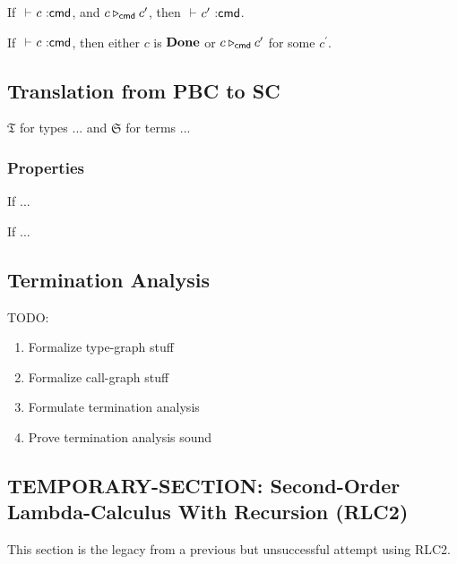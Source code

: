 \begin{theorem}[Preservation]
  If $\typecmd{}{c}$, and $c \triangleright_{\mathsf{cmd}} c^{\prime}$, then $\typecmd{}{c^{\prime}}$.
\end{theorem}

\begin{theorem}[Progress]
  If $\typecmd{}{c}$, then either $c$ is $\mathbf{Done}$ or $c \triangleright_{\mathsf{cmd}} c^{\prime}$ for some $c^{\prime}$.
\end{theorem}

\subsection{Translation from PBC to SC}

$\mathfrak{T}$ for types ... and $\mathfrak{S}$ for terms ...

\subsubsection{Properties}

\begin{lemma}[...]
  If ...
\end{lemma}

\begin{theorem}[...]
  If ...
\end{theorem}

\subsection{Termination Analysis}

TODO:

\begin{enumerate}
  \item Formalize type-graph stuff
  \item Formalize call-graph stuff
  \item Formulate termination analysis
  \item Prove termination analysis sound
\end{enumerate}

\subsection{TEMPORARY-SECTION: Second-Order Lambda-Calculus With Recursion (RLC2)}

This section is the legacy from a previous but unsuccessful attempt using RLC2.


